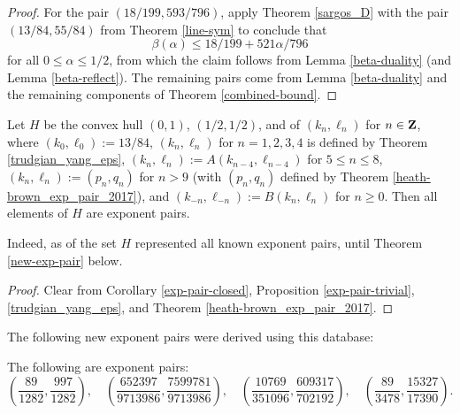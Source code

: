 \literature
{}

\begin{proof}  For the pair $(18/199, 593/796)$, apply Theorem \ref{sargos_D} with the pair $(13/84, 55/84)$ from Theorem \ref{line-sym} to conclude that
    $$ \beta(\alpha) \leq 18/199 + 521 \alpha / 796$$
    for all $0 \leq \alpha \leq 1/2$, from which the claim follows from Lemma \ref{beta-duality} (and Lemma \ref{beta-reflect}).
The remaining pairs come from Lemma \ref{beta-duality} and the remaining components of Theorem \ref{combined-bound}.
\end{proof}

\begin{corollary}\label{H-pairs}\cite[Theorem 1.3]{trudgian-yang}  Let $H$ be the convex hull $(0,1)$, $(1/2,1/2)$, and of $(k_n,\ell_n)$ for $n \in \mathbf{Z}$, where $(k_0,\ell_0) := 13/84$, $(k_n,\ell_n)$ for $n=1,2,3,4$ is defined by Theorem \ref{trudgian_yang_eps}, $(k_n,\ell_n) := A(k_{n-4},\ell_{n-4})$ for $5 \leq n \leq 8$, $(k_n,\ell_n) := (p_n,q_n)$ for $n > 9$ (with $(p_n,q_n)$ defined by Theorem \ref{heath-brown_exp_pair_2017}), and $(k_{-n},\ell_{-n}) := B(k_n,\ell_n)$ for $n \geq 0$.  Then all elements of $H$ are exponent pairs.
\end{corollary}

Indeed, as of \cite{trudgian-yang} the set $H$ represented all known exponent pairs, until Theorem \ref{new-exp-pair} below.

\begin{proof} Clear from Corollary \ref{exp-pair-closed}, Proposition \ref{exp-pair-trivial}, \ref{trudgian_yang_eps}, and Theorem \ref{heath-brown_exp_pair_2017}.
\end{proof}

The following new exponent pairs were derived using this database:

\begin{theorem}\label{new-exp-pair} The following are exponent pairs:
\[
\left(\frac{89}{1282}, \frac{997}{1282}\right),\quad \left(\frac{652397}{9713986}, \frac{7599781}{9713986}\right),\quad \left(\frac{10769}{351096}, \frac{609317}{702192}\right),\quad \left(\frac{89}{3478}, \frac{15327}{17390}\right).
\]
\end{theorem}
\derived
{}

